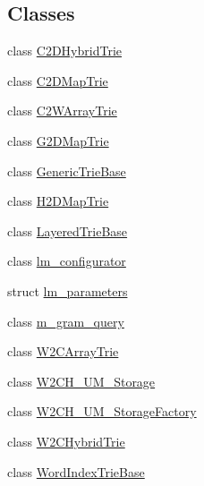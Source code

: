 \subsection*{Classes}
\begin{DoxyCompactItemize}
\item 
class \hyperlink{classuva_1_1smt_1_1bpbd_1_1server_1_1lm_1_1_c2_d_hybrid_trie}{C2\+D\+Hybrid\+Trie}
\item 
class \hyperlink{classuva_1_1smt_1_1bpbd_1_1server_1_1lm_1_1_c2_d_map_trie}{C2\+D\+Map\+Trie}
\item 
class \hyperlink{classuva_1_1smt_1_1bpbd_1_1server_1_1lm_1_1_c2_w_array_trie}{C2\+W\+Array\+Trie}
\item 
class \hyperlink{classuva_1_1smt_1_1bpbd_1_1server_1_1lm_1_1_g2_d_map_trie}{G2\+D\+Map\+Trie}
\item 
class \hyperlink{classuva_1_1smt_1_1bpbd_1_1server_1_1lm_1_1_generic_trie_base}{Generic\+Trie\+Base}
\item 
class \hyperlink{classuva_1_1smt_1_1bpbd_1_1server_1_1lm_1_1_h2_d_map_trie}{H2\+D\+Map\+Trie}
\item 
class \hyperlink{classuva_1_1smt_1_1bpbd_1_1server_1_1lm_1_1_layered_trie_base}{Layered\+Trie\+Base}
\item 
class \hyperlink{classuva_1_1smt_1_1bpbd_1_1server_1_1lm_1_1lm__configurator}{lm\+\_\+configurator}
\item 
struct \hyperlink{structuva_1_1smt_1_1bpbd_1_1server_1_1lm_1_1lm__parameters}{lm\+\_\+parameters}
\item 
class \hyperlink{classuva_1_1smt_1_1bpbd_1_1server_1_1lm_1_1m__gram__query}{m\+\_\+gram\+\_\+query}
\item 
class \hyperlink{classuva_1_1smt_1_1bpbd_1_1server_1_1lm_1_1_w2_c_array_trie}{W2\+C\+Array\+Trie}
\item 
class \hyperlink{classuva_1_1smt_1_1bpbd_1_1server_1_1lm_1_1_w2_c_h___u_m___storage}{W2\+C\+H\+\_\+\+U\+M\+\_\+\+Storage}
\item 
class \hyperlink{classuva_1_1smt_1_1bpbd_1_1server_1_1lm_1_1_w2_c_h___u_m___storage_factory}{W2\+C\+H\+\_\+\+U\+M\+\_\+\+Storage\+Factory}
\item 
class \hyperlink{classuva_1_1smt_1_1bpbd_1_1server_1_1lm_1_1_w2_c_hybrid_trie}{W2\+C\+Hybrid\+Trie}
\item 
class \hyperlink{classuva_1_1smt_1_1bpbd_1_1server_1_1lm_1_1_word_index_trie_base}{Word\+Index\+Trie\+Base}
\end{DoxyCompactItemize}
